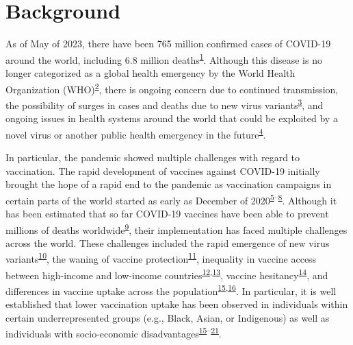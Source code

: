 \documentclass[
]{article}
\begin{document}
\hypertarget{background}{%
\section{Background}\label{background}}

As of May of 2023, there have been 765 million confirmed cases of
COVID-19 around the world, including 6.8 million
deaths\textsuperscript{\protect\hyperlink{ref-WHO-Covid}{1}}. Although
this disease is no longer categorized as a global health emergency by
the World Health Organization
(WHO)\textsuperscript{\protect\hyperlink{ref-rigby2023}{2}}, there is
ongoing concern due to continued transmission, the possibility of surges
in cases and deaths due to new virus
variants\textsuperscript{\protect\hyperlink{ref-un2023}{3}}, and ongoing
issues in health systems around the world that could be exploited by a
novel virus or another public health emergency in the
future\textsuperscript{\protect\hyperlink{ref-mackey2021}{4}}.

In particular, the pandemic showed multiple challenges with regard to
vaccination. The rapid development of vaccines against COVID-19
initially brought the hope of a rapid end to the pandemic as vaccination
campaigns in certain parts of the world started as early as December of
2020\textsuperscript{\protect\hyperlink{ref-thelancet2021}{5}--\protect\hyperlink{ref-tanne2020}{8}}.
Although it has been estimated that so far COVID-19 vaccines have been
able to prevent millions of deaths
worldwide\textsuperscript{\protect\hyperlink{ref-watson2022}{9}}, their
implementation has faced multiple challenges across the world. These
challenges included the rapid emergence of new virus
variants\textsuperscript{\protect\hyperlink{ref-li2021}{10}}, the waning
of vaccine
protection\textsuperscript{\protect\hyperlink{ref-dolgin2021}{11}},
inequality in vaccine access between high-income and low-income
countries\textsuperscript{\protect\hyperlink{ref-gerretsen2021}{12},\protect\hyperlink{ref-tamey2022}{13}},
vaccine
hesitancy\textsuperscript{\protect\hyperlink{ref-nafilyan2021}{14}}, and
differences in vaccine uptake across the
population\textsuperscript{\protect\hyperlink{ref-willis2021}{15},\protect\hyperlink{ref-skirrow2022}{16}}.
In particular, it is well established that lower vaccination uptake has
been observed in individuals within certain underrepresented groups
(e.g., Black, Asian, or Indigenous) as well as individuals with
socio-economic
disadvantages\textsuperscript{\protect\hyperlink{ref-willis2021}{15}--\protect\hyperlink{ref-hussain2022}{21}}.
\end{document}
